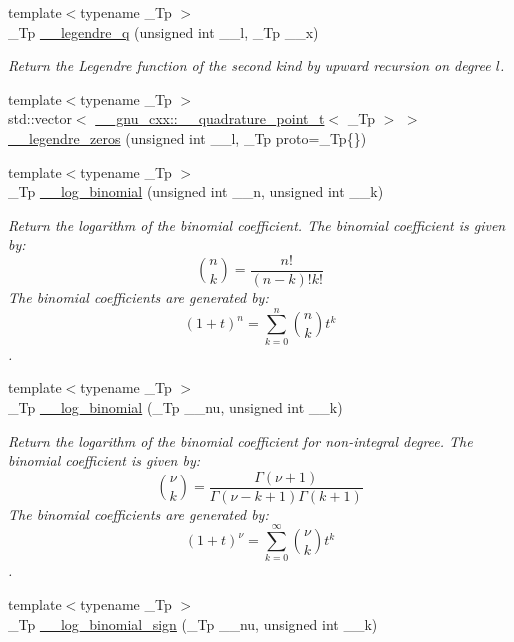 \begin{DoxyCompactItemize}
{\footnotesize template$<$typename \+\_\+\+Tp $>$ }\\\+\_\+\+Tp \hyperlink{namespacestd_1_1____detail_a0643760e0d1701df4db880b2ad969055}{\+\_\+\+\_\+legendre\+\_\+q} (unsigned int \+\_\+\+\_\+l, \+\_\+\+Tp \+\_\+\+\_\+x)
\begin{DoxyCompactList}\small\item\em Return the Legendre function of the second kind by upward recursion on degree $ l $. \end{DoxyCompactList}\item 
{\footnotesize template$<$typename \+\_\+\+Tp $>$ }\\std\+::vector$<$ \hyperlink{struct____gnu__cxx_1_1____quadrature__point__t}{\+\_\+\+\_\+gnu\+\_\+cxx\+::\+\_\+\+\_\+quadrature\+\_\+point\+\_\+t}$<$ \+\_\+\+Tp $>$ $>$ \hyperlink{namespacestd_1_1____detail_a9d53ac0fd39232190e7564fa067a878d}{\+\_\+\+\_\+legendre\+\_\+zeros} (unsigned int \+\_\+\+\_\+l, \+\_\+\+Tp proto=\+\_\+\+Tp\{\})
\item 
{\footnotesize template$<$typename \+\_\+\+Tp $>$ }\\\+\_\+\+Tp \hyperlink{namespacestd_1_1____detail_a087d65f98ba6a6709b4d62fa32445e59}{\+\_\+\+\_\+log\+\_\+binomial} (unsigned int \+\_\+\+\_\+n, unsigned int \+\_\+\+\_\+k)
\begin{DoxyCompactList}\small\item\em Return the logarithm of the binomial coefficient. The binomial coefficient is given by\+: \[ \binom{n}{k} = \frac{n!}{(n-k)! k!} \] The binomial coefficients are generated by\+: \[ \left(1 + t\right)^n = \sum_{k=0}^n \binom{n}{k} t^k \]. \end{DoxyCompactList}\item 
{\footnotesize template$<$typename \+\_\+\+Tp $>$ }\\\+\_\+\+Tp \hyperlink{namespacestd_1_1____detail_af8613458310f575d1a1b162553abe4aa}{\+\_\+\+\_\+log\+\_\+binomial} (\+\_\+\+Tp \+\_\+\+\_\+nu, unsigned int \+\_\+\+\_\+k)
\begin{DoxyCompactList}\small\item\em Return the logarithm of the binomial coefficient for non-\/integral degree. The binomial coefficient is given by\+: \[ \binom{\nu}{k} = \frac{\Gamma(\nu+1)}{\Gamma(\nu-k+1) \Gamma(k+1)} \] The binomial coefficients are generated by\+: \[ \left(1 + t\right)^\nu = \sum_{k=0}^\infty \binom{\nu}{k} t^k \]. \end{DoxyCompactList}\item 
{\footnotesize template$<$typename \+\_\+\+Tp $>$ }\\\+\_\+\+Tp \hyperlink{namespacestd_1_1____detail_aa89a8a5ced6325e1d64782f84e4ad95d}{\+\_\+\+\_\+log\+\_\+binomial\+\_\+sign} (\+\_\+\+Tp \+\_\+\+\_\+nu, unsigned int \+\_\+\+\_\+k)

\end{DoxyCompactItemize}
